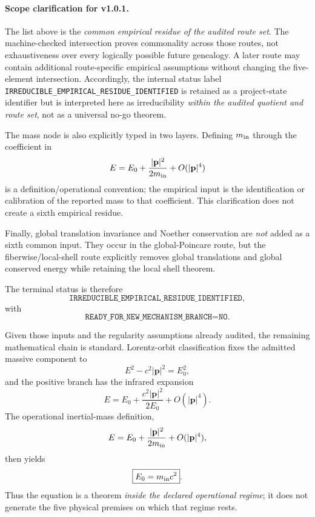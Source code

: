 \documentclass[11pt,a4paper]{article}
\begin{document}
\paragraph{Scope clarification for v1.0.1.}
The list above is the \emph{common empirical residue of the audited route set}.  The machine-checked intersection proves commonality across those routes, not exhaustiveness over every logically possible future genealogy.  A later route may contain additional route-specific empirical assumptions without changing the five-element intersection.  Accordingly, the internal status label \texttt{IRREDUCIBLE\_EMPIRICAL\_RESIDUE\_IDENTIFIED} is retained as a project-state identifier but is interpreted here as irreducibility \emph{within the audited quotient and route set}, not as a universal no-go theorem.

The mass node is also explicitly typed in two layers.  Defining $m_{\rm in}$ through the coefficient in
\begin{equation}
E=E_0+\frac{|\mathbf p|^2}{2m_{\rm in}}+O(|\mathbf p|^4)
\end{equation}
is a definition/operational convention; the empirical input is the identification or calibration of the reported mass to that coefficient.  This clarification does not create a sixth empirical residue.

Finally, global translation invariance and Noether conservation are \emph{not} added as a sixth common input.  They occur in the global-Poincare route, but the fiberwise/local-shell route explicitly removes global translations and global conserved energy while retaining the local shell theorem.

The terminal status is therefore
\begin{equation}
\boxed{\texttt{IRREDUCIBLE\_EMPIRICAL\_RESIDUE\_IDENTIFIED}},
\end{equation}
with
\begin{equation}
\boxed{\texttt{READY\_FOR\_NEW\_MECHANISM\_BRANCH=NO}}.
\end{equation}

Given those inputs and the regularity assumptions already audited, the remaining mathematical chain is standard. Lorentz-orbit classification fixes the admitted massive component to
\begin{equation}
E^2-c^2|\mathbf p|^2=E_0^2,
\end{equation}
and the positive branch has the infrared expansion
\begin{equation}
E=E_0+\frac{c^2|\mathbf p|^2}{2E_0}+O(|\mathbf p|^4).
\end{equation}
The operational inertial-mass definition,
\begin{equation}
E=E_0+\frac{|\mathbf p|^2}{2m_{\rm in}}+O(|\mathbf p|^4),
\end{equation}
then yields
\begin{equation}
\boxed{E_0=m_{\rm in}c^2}.
\end{equation}
Thus the equation is a theorem \emph{inside the declared operational regime}; it does not generate the five physical premises on which that regime rests.
\end{document}
